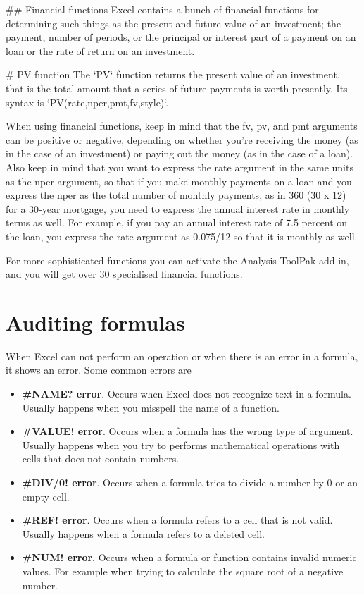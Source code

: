 ## Financial functions
Excel contains a bunch of financial functions for determining such things as the present and future value of an investment; the payment, number of periods, or the principal or interest part of a payment on an loan or the rate of return on an investment.


# PV function
The `PV` function returns the present value of an investment, that is the total amount that a series of future payments is worth presently. Its syntax is `PV(rate,nper,pmt,fv,style)`.   

When using financial functions, keep in mind that the fv, pv, and pmt arguments can be positive or negative, depending on whether you’re receiving the money (as in the case of an investment) or paying out the money (as in the case of a loan). Also keep in mind that you want to express the rate argument in the same units as the nper argument, so that if you make monthly payments on a loan and you express the nper as the total number of monthly payments, as in 360 (30 x 12) for a 30-year mortgage, you need to express the annual interest rate in monthly terms as well. For example, if you pay an annual interest rate of 7.5 percent on the loan, you express the rate argument as 0.075/12 so that it is monthly as well.

For more sophisticated functions you can activate the Analysis ToolPak add-in, and you will get over 30 specialised financial functions. 


\chapter{Auditing formulas}
\label{auditingformulas}

When Excel can not perform an operation or when there is an error in a formula, it shows an error. Some common errors are

\begin{itemize}
\item \textbf{\#NAME? error}. Occurs when Excel does not recognize text in a formula. Usually happens when you misspell the name of a function.

\item \textbf{\#VALUE! error}. Occurs when a formula has the wrong type of argument. Usually happens when you try to performs mathematical operations with cells that does not contain numbers.

\item \textbf{\#DIV\slash 0! error}. Occurs when a formula tries to divide a number by 0 or an empty cell.

\item \textbf{\#REF! error}. Occurs when a formula refers to a cell that is not valid. Usually happens when a formula refers to a deleted cell.

\item \textbf{\#NUM! error}. Occurs when a formula or function contains invalid numeric values. For example when trying to calculate the square root of a negative number.

\end{itemize}


